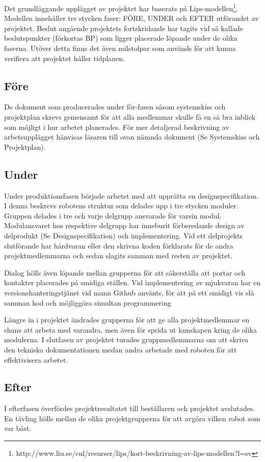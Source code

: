 \documentclass[a4paper,12pt,fleqn]{article}
\begin{document}
Det grundläggande upplägget av projektet har baserats på Lips-modellen\footnote{http://www.liu.se/cul/resurser/lips/kort-beskrivning-av-lips-modellen?l=sv}. Modellen innehåller tre stycken faser: FÖRE, UNDER och EFTER utförandet av projektet. Beslut angående projektets fortskridande har tagits vid så kallade beslutspunkter (förkortas BP) som ligger placerade löpande under de olika faserna. Utöver detta finns det även milstolpar som används för att kunna verifiera att projektet håller tidplanen. 

\subsection{Före}
De dokument som producerades under för-fasen såsom systemskiss och projektplan skrevs gemensamt för att alla medlemmar skulle få en så bra inblick som möjligt i hur arbetet planerades. För mer detaljerad beskrivning av arbetsupplägget hänvisas läsaren till ovan nämnda dokument (Se Systemskiss och Projektplan).

\subsection{Under}
Under produktionsfasen började arbetet med att upprätta en designspecifikation. I denna beskrevs robotens struktur som delades upp i tre stycken moduler. Gruppen delades i tre och varje delgrupp ansvarade för varsin modul. Modulansvaret hos respektive delgrupp har inneburit förberedande design av delprodukt (Se Designspecifikation) och implementering. 
Vid ett delprojekts slutförande har hårdvaran eller den skrivna koden förklarats för de andra projektmedlemmarna och sedan slagits samman med resten av projektet. 

Dialog hölls även löpande mellan grupperna för att säkerställa att portar och kontakter placerades på smidiga ställen. Vid implementering av mjukvaran har en versionshanteringstjänst vid namn Github använts, för att på ett smidigt vis slå samman kod och möjliggöra simultan programmering

Längre in i projektet ändrades grupperna för att ge alla projektmedlemmar en chans att arbeta med varandra, men även för sprida ut kunskapen kring de olika modulerna.
I slutfasen av projektet turades gruppmedlemmarna om att skriva den tekniska dokumentationen medan andra arbetade med roboten för att effektivisera arbetet.

\subsection{Efter}
I efterfasen överfördes projektresultatet till beställaren och projektet avslutades. En tävling hölls mellan de olika projektgrupperna för att avgöra vilken robot som var bäst. 
\end{document}
